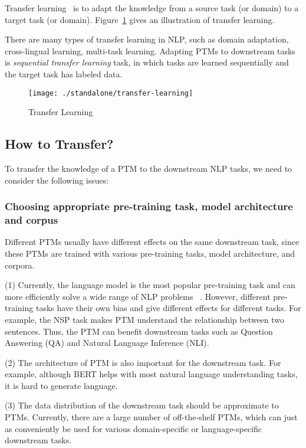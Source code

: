 \documentclass[fleqn]{SCYE-arxiv}
\begin{document}
\begin{multicols}{2}
Transfer learning~\cite{pan2009survey} is to adapt the knowledge from a source task (or domain) to a target task (or domain). Figure~\ref{fig:transfer-learning} gives an illustration of transfer learning.

There are many types of transfer learning in NLP, such as domain adaptation, cross-lingual learning, multi-task learning.
Adapting PTMs to downstream tasks is \textit{sequential transfer learning} task, in which tasks are learned sequentially and the target task has labeled data.

\begin{figure}[H]
  \centering
  \texttt{[image: ./standalone/transfer-learning]}
  \caption{Transfer Learning}
  \label{fig:transfer-learning}
\end{figure}

\subsection{How to Transfer?}


To transfer the knowledge of a PTM to the downstream NLP tasks, we need to consider the following issues:

\subsubsection{Choosing appropriate pre-training task, model architecture and corpus}

Different PTMs usually have different effects on the same downstream task, since these PTMs are trained with various pre-training tasks, model architecture, and corpora.

(1) Currently, the language model is the most popular pre-training task and can more efficiently solve a wide range of NLP problems ~\cite{radford2019language}.
However,
different pre-training tasks have their own bias and give different effects for different tasks.
For example, the NSP task \cite{devlin2019bert} makes PTM understand the relationship between two sentences. Thus, the PTM can benefit downstream tasks such as Question Answering (QA) and Natural Language Inference (NLI).

(2) The architecture of PTM is also important for the downstream task. For example, although BERT helps with most natural language understanding tasks, it is hard to generate language.

(3) The data distribution of the downstream task should be approximate to PTMs. Currently, there are a large number of off-the-shelf PTMs, which can just as conveniently be used for various domain-specific or language-specific downstream tasks.


\end{multicols}
\end{document}
